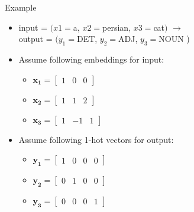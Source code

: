 \documentclass[12pt]{beamer}
\begin{document}
\begin{frame}{Example}
	\begin{itemize}
		\item input = $\big( x1=$a, $x2=$persian, $x3=$cat$ \big) $ $\longrightarrow$ \\ output = $ \big( y_1=$DET, $y_2=$ADJ, $y_3=$NOUN \big) 
		\item Assume following embeddings for input:
		\begin{itemize}
			\item $\bm{x_1} = \begin{bmatrix} 1 & 0 & 0 \end{bmatrix}$
			\item $\bm{x_2} = \begin{bmatrix} 1 & 1 & 2 \end{bmatrix}$
			\item $\bm{x_3} = \begin{bmatrix}  1 & -1 & 1 \end{bmatrix}$
		\end{itemize}
		\item Assume following 1-hot vectors for output:
		\begin{itemize}
			\item $\bm{y_1} = \begin{bmatrix} 1 & 0 & 0 & 0\end{bmatrix}$
			\item $\bm{y_2} = \begin{bmatrix} 0 & 1 & 0 & 0\end{bmatrix}$
			\item $\bm{y_3} = \begin{bmatrix} 0 & 0 & 0 & 1\end{bmatrix}$
		\end{itemize}
	\end{itemize}
\end{frame}
\end{document}
